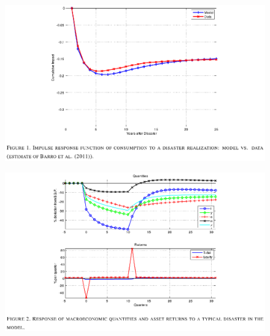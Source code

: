\documentclass{beamer}
\begin{document}
\begin{frame}
  \begin{figure}
    \includegraphics[scale=.8]{gourio1.eps}
  \end{figure}
\end{frame}

\begin{frame}
\begin{figure}
    \includegraphics[scale=.8]{gourio2.eps}
  \end{figure}
\end{frame}
\end{document}
